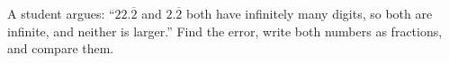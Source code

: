 A student argues: ``$22.\overline{2}$ and $2.\overline{2}$ both have infinitely many digits, so both are infinite, and neither is larger.'' Find the error, write both numbers as fractions, and compare them.

